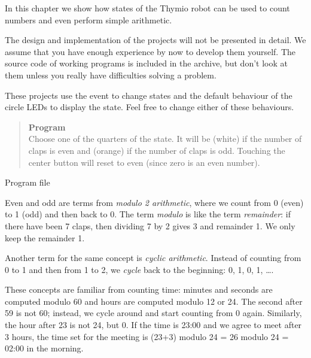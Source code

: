 
\label{ch.counting}

In this chapter we show how states of the Thymio robot can be used to
count numbers and even perform simple arithmetic.

The design and implementation of the projects will not be presented
in detail. We assume that you have enough experience by now to develop
them yourself. The source code of working programs is included in the
archive, but don't look at them unless you really have difficulties
solving a problem.

These projects use the  event to change states and
the default behaviour of the circle LEDs to display the state.
Feel free to change either of these behaviours.




\begin{quote}
\textbf{Program}\\Choose one of the quarters of the state.
It will be  (white) if the number of claps
is even and  (orange) if the number of claps is odd.
Touching the center button will reset to even
(since zero is an even number).
\end{quote}

{\raggedleft \hfill Program file }

Even and odd are terms from \emph{modulo 2 arithmetic}, where we count
from 0 (even) to 1 (odd) and then back to 0. The term \emph{modulo} is
like the term \emph{remainder}: if there have been 7 claps, then
dividing 7 by 2 gives 3 and remainder 1. We only keep the remainder 1.

Another term for the same concept is \emph{cyclic arithmetic}.
Instead of counting from 0 to 1 and then from 1 to 2,
we \emph{cycle} back to the beginning:
0, 1, 0, 1, \ldots.

These concepts are familiar from counting time: minutes and seconds are
computed modulo 60 and hours are computed modulo 12 or 24. The second
after 59 is not 60; instead, we cycle around and start counting from 0
again. Similarly, the hour after 23 is not 24, but 0. If the time is
23:00 and we agree to meet after 3 hours, the time set for the meeting
is (23+3) modulo 24 = 26 modulo 24 = 02:00 in the morning.


